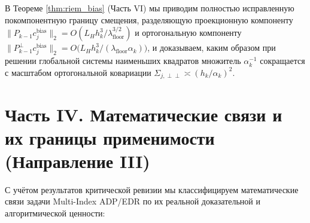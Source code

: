 \documentclass[11pt,a4paper]{article}
\theoremstyle{definition}
\theoremstyle{remark}
\begin{document}
В Теореме \ref{thm:riem_bias} (Часть VI) мы приводим полностью исправленную покомпонентную границу смещения, разделяющую проекционную компоненту $\|P_{k-1} c_j^{\mathrm{bias}}\|_2 = O(L_H h_k^3 / \lambda_{\mathrm{floor}}^{3/2})$ и ортогональную компоненту $\|P_{k-1}^\perp c_j^{\mathrm{bias}}\|_2 = O\bigl(L_H h_k^3 / (\lambda_{\mathrm{floor}}\alpha_k)\bigr)$, и доказываем, каким образом при решении глобальной системы наименьших квадратов множитель $\alpha_k^{-1}$ сокращается с масштабом ортогональной ковариации $\Sigma_{j,\perp\perp} \asymp (h_k/\alpha_k)^2$.

\section{Часть IV. Математические связи и их границы применимости (Направление III)}
\label{sec:part4}

С учётом результатов критической ревизии мы классифицируем математические связи задачи Multi-Index ADP/EDR по их реальной доказательной и алгоритмической ценности:
\end{document}
